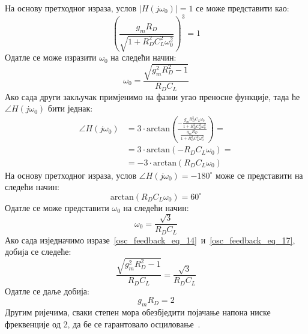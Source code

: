 \documentclass[master]{finthesis}
\begin{document}
На основу претходног израза, услов $|H(j\omega_{0})|=1$ се може представити као:
\begin{equation}
	\label{osc_feedback_eq_13}
	\displaystyle
	\left(\frac{g_{m}R_{D}}{\sqrt{1+R_{D}^{2}C_{L}^{2}\omega_{0}^{2}}}\right)^{3} = 1
\end{equation}
Одатле се може изразити $\omega_{0}$ на следећи начин:
\begin{equation}
	\label{osc_feedback_eq_14}
	\displaystyle
	\omega_{0} = \frac{\sqrt{g_{m}^{2}R_{D}^{2}-1}}{R_{D}C_{L}}
\end{equation}
Ако сада други закључак примјенимо на фазни угао преносне функције, тада ће $\angle H(j\omega_{0})$ бити једнак:
\begin{equation}
	\label{osc_feedback_eq_15}
	\displaystyle
	\begin{split}
		\angle H(j\omega_{0}) &= 3\cdot\text{arctan}\left(\frac{\displaystyle -\frac{g_{m}R_{D}^{2}C_{L}\omega_{0}}{1+R_{D}^{2}C_{L}^{2}\omega_{0}^2}}{\displaystyle \frac{g_{m}R_{D}}{1+R_{D}^{2}C_{L}^{2}\omega_{0}^2}}\right) = \\
				     &= 3\cdot\text{arctan}(-R_{D}C_{L}\omega_{0}) = \\
				     &= -3\cdot\text{arctan}(R_{D}C_{L}\omega_{0})
	\end{split}
\end{equation}
На основу претходног израза, услов $\angle H(j\omega_{0}) = -180^{\circ}$ може се представити на следећи начин:
\begin{equation}
	\label{osc_feedback_eq_16}
	\displaystyle
	\text{arctan}(R_{D}C_{L}\omega_{0}) = 60^{\circ}
\end{equation}
Одатле се може представити $\omega_{0}$ на следећи начин:
\begin{equation}
	\label{osc_feedback_eq_17}
	\displaystyle
	\omega_{0} = \frac{\sqrt{3}}{R_{D}C_{L}}
\end{equation}
Ако сада изједначимо изразе~\ref{osc_feedback_eq_14}~и~\ref{osc_feedback_eq_17}, добија се следеће:
\begin{equation}
	\label{osc_feedback_eq_18}
	\displaystyle
	\frac{\sqrt{g_{m}^{2}R_{D}^{2}-1}}{R_{D}C_{L}} = \frac{\sqrt{3}}{R_{D}C_{L}}
\end{equation}
Одатле се даље добија:
\begin{equation}
	\label{osc_feedback_eq_19}
	\displaystyle
	g_{m}R_{D} = 2
\end{equation}
Другим ријечима, сваки степен мора обезбједити појачање напона ниске фреквенције од 2, да бе се гарантовало осциловање~\cite{Razavi:PLL_CMOS_2020}. \par
\end{document}
